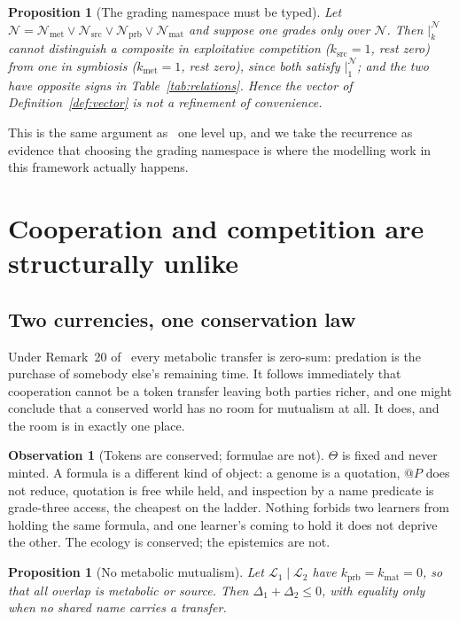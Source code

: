 \documentclass[11pt,a4paper]{article}
\theoremstyle{plain}
\newtheorem{proposition}[theorem]{Proposition}
\theoremstyle{definition}
\newtheorem{observation}[theorem]{Observation}
\theoremstyle{remark}
\newcommand{\Lrn}{\mathcal{L}}
\newcommand{\Nsp}{\mathcal{N}}
\newcommand{\Met}{\Nsp_{\mathrm{met}}}
\newcommand{\Src}{\Nsp_{\mathrm{src}}}
\newcommand{\Prb}{\Nsp_{\mathrm{prb}}}
\newcommand{\Mat}{\Nsp_{\mathrm{mat}}}
\newcommand{\sep}[2]{\mathbin{\big|^{#1}_{#2}}}
\begin{document}
\begin{proposition}[The grading namespace must be typed]
Let $\Nsp = \Met \vee \Src \vee \Prb \vee \Mat$ and suppose one grades only over $\Nsp$. Then
$\sep{\Nsp}{k}$ cannot distinguish a composite in exploitative competition ($k_{\mathrm{src}}=1$,
rest zero) from one in symbiosis ($k_{\mathrm{met}}=1$, rest zero), since both satisfy
$\sep{\Nsp}{1}$; and the two have opposite signs in Table~\ref{tab:relations}. Hence the vector
of Definition~\ref{def:vector} is not a refinement of convenience.
\end{proposition}

This is the same argument as~\cite[Prop.~7]{game} one level up, and we take the recurrence as
evidence that choosing the grading namespace is where the modelling work in this framework
actually happens.

\section{Cooperation and competition are structurally unlike}\label{sec:coop}

\subsection{Two currencies, one conservation law}

Under Remark~20 of~\cite{scientist} every metabolic transfer is zero-sum: predation is the
purchase of somebody else's remaining time. It follows immediately that cooperation cannot be a
token transfer leaving both parties richer, and one might conclude that a conserved world has no
room for mutualism at all. It does, and the room is in exactly one place.

\begin{observation}[Tokens are conserved; formulae are not]\label{obs:two}
$\Theta$ is fixed and never minted. A formula is a different kind of object: a genome is a
quotation, $@P$ does not reduce, quotation is free while held, and inspection by a name predicate
is grade-three access, the cheapest on the ladder. Nothing forbids two learners from holding the
same formula, and one learner's coming to hold it does not deprive the other. The ecology is
conserved; the epistemics are not.
\end{observation}

\begin{proposition}[No metabolic mutualism]\label{prop:nomet}
Let $\Lrn_1 \mid \Lrn_2$ have $k_{\mathrm{prb}} = k_{\mathrm{mat}} = 0$, so that all overlap is
metabolic or source. Then $\Delta_1 + \Delta_2 \leq 0$, with equality only when no shared name
carries a transfer.
\end{proposition}
\end{document}
